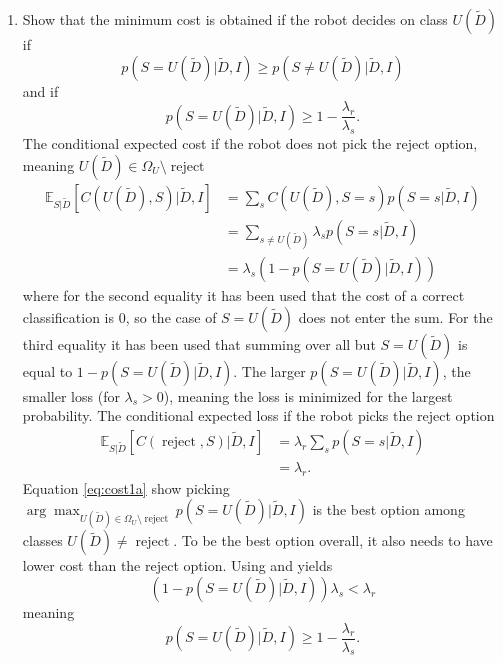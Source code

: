 \begin{example}
	\begin{enumerate}
		\item Show that the minimum cost is obtained if the robot decides on class $U(\tilde{D})$ if
		\begin{equation}
			p(S=U(\tilde{D})|\tilde{D},I)\geq p(S\neq U(\tilde{D})|\tilde{D},I)
		\end{equation}
		 and if 
		 \begin{equation}
		 	p(S=U(\tilde{D})|\tilde{D},I)\geq 1-\frac{\lambda_r}{\lambda_s}.
		 \end{equation}
		The conditional expected cost if the robot does not pick the reject option, meaning $U(\tilde{D})\in \Omega_U\setminus\operatorname{reject}$
		\begin{equation}
			\begin{split}
				\mathbb{E}_{S|\tilde{D}}[C(U(\tilde{D}), S)|\tilde{D},I] & = \sum_s C(U(\tilde{D}),S=s)p(S=s|\tilde{D},I)\\
				&= \sum_{s\neq U(\tilde{D})}\lambda_sp(S=s|\tilde{D},I)\\
				&= \lambda_s(1-p(S=U(\tilde{D})|\tilde{D},I))
			\end{split}
			\label{eq:cost1a}
		\end{equation}
		where for the second equality it has been used that the cost of a correct classification is $0$, so the case of $S=U(\tilde{D})$ does not enter the sum. For the third equality it has been used that summing over all but $S=U(\tilde{D})$ is equal to $1-p(S=U(\tilde{D})|\tilde{D},I)$. The larger $p(S=U(\tilde{D})|\tilde{D},I)$, the smaller loss (for $\lambda_s>0$), meaning the loss is minimized for the largest probability. The conditional expected loss if the robot picks the reject option
		\begin{equation}
			\begin{split}
				\mathbb{E}_{S|\tilde{D}}[C(\operatorname{reject}, S)|\tilde{D},I]&= \lambda_r\sum_sp(S=s|\tilde{D},I)\\
				&=\lambda_r.
			\end{split}
			\label{eq:cost2a}
		\end{equation}
		Equation \eqref{eq:cost1a} show picking $\arg\max_{U(\tilde{D})\in \Omega_U\setminus \operatorname{reject}} p(S=U(\tilde{D})|\tilde{D},I)$ is the best option among classes $U(\tilde{D})\neq \operatorname{reject}$. To be the best option overall, it also needs to have lower cost than the reject option. Using  and  yields
		\begin{equation}
			(1-p(S=U(\tilde{D})|\tilde{D},I))\lambda_s< \lambda_r
		\end{equation}
		meaning
		\begin{equation}
			p(S=U(\tilde{D})|\tilde{D},I)\geq 1-\frac{\lambda_r}{\lambda_s}.
		\end{equation}
		

\end{enumerate}
\end{example}

